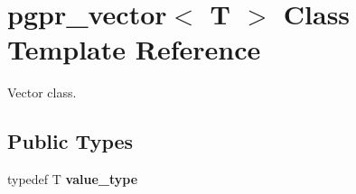 \hypertarget{classpgpr__vector}{\section{pgpr\+\_\+vector$<$ T $>$ Class Template Reference}
\label{classpgpr__vector}
}


Vector class.  


\subsection*{Public Types}
\begin{DoxyCompactItemize}
\item 
\hypertarget{classpgpr__vector_ad23bca84220aeefcc7057b9b951e7b0e}{typedef T {\bfseries value\+\_\+type}}\label{classpgpr__vector_ad23bca84220aeefcc7057b9b951e7b0e}

\end{DoxyCompactItemize}
